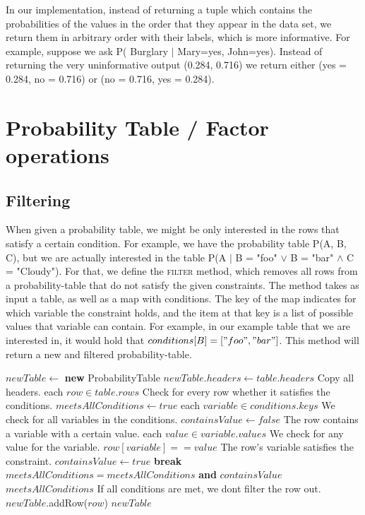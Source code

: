\documentclass[10pt,a4paper]{article}
\begin{document}
In our implementation, instead of returning a tuple which contains the probabilities of the values in the order that they appear in the data set, we return them in arbitrary order with their labels, which is more informative. For example, suppose we ask P( Burglary $|$ Mary=yes, John=yes). Instead of returning the very uninformative output (0.284, 0.716) we return either (yes = 0.284, no = 0.716) or (no = 0.716, yes = 0.284).
\section{Probability Table / Factor operations}
\subsection{Filtering}
When given a probability table, we might be only interested in the rows that satisfy a certain condition. For example, we have the probability table P(A, B, C), but we are actually interested in the table P(A $|$ B = "foo" $\vee$ B = "bar" $\wedge$ C = "Cloudy"). For that, we define the \textsc{filter} method, which removes all rows from a probability-table that do not satisfy the given constraints. The method takes as input a table, as well as a map with conditions. The key of the map indicates for which variable the constraint holds, and the item at that key is a list of possible values that variable can contain. For example, in our example table that we are interested in, it would hold that $conditions[B] = [ "foo", "bar" ]$. This method will return a new and filtered probability-table.
\begin{codebox}
\li $newTable \gets $ \textbf{new} ProbabilityTable
\li $newTable.headers \gets table.headers$ \Comment Copy all headers.
\zi
\li \For each $row \in table.rows$ \Comment Check for every row whether it satisfies the conditions. \Do
\li     $meetsAllConditions \gets true$
\li     \For each $variable \in conditions.keys$ \Comment We check for all variables in the conditions. \Do
\li         $containsValue \gets false$ \Comment The row contains a variable with a certain value.
\li         \For each $value \in variable.values$ \Comment We check for any value for the variable. \Do
\li             \If $row[variable] == value$ \Comment The row's variable satisfies the constraint. \Then
\li                 $containsValue \gets true$
\li                 \textbf{break}
                \End
            \End
\li         $meetsAllConditions = meetsAllConditions$ \textbf{and} $containsValue$
        \End
\zi
\li     \If $meetsAllConditions$ \Comment If all conditions are met, we dont filter the row out. \Then
\li         $newTable$.{\sc addRow}($row$)
        \End
    \End
\zi
\li \Return $newTable$
\end{codebox}
\end{document}
